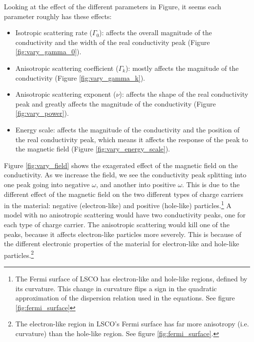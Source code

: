 Looking at the effect of the different parameters in Figure, it seems each parameter roughly has
these effects:
\begin{itemize}
    \item Isotropic scattering rate ($\Gamma_0$): affects the overall magnitude of the conductivity
        and the width of the real conductivity peak (Figure \ref{fig:vary_gamma_0}).
    \item Anisotropic scattering coefficient ($\Gamma_k$): mostly affects the magnitude of the
        conductivity (Figure \ref{fig:vary_gamma_k}).
    \item Anisotropic scattering exponent ($\nu$): affects the shape of the real conductivity peak
        and greatly affects the magnitude of the conductivity (Figure \ref{fig:vary_power}).
    \item Energy scale: affects the magnitude of the conductivity and the position of the real
        conductivity peak, which means it affects the response of the peak to the magnetic field
        (Figure \ref{fig:vary_energy_scale}).
\end{itemize}

Figure \ref{fig:vary_field} shows the exagerated effect of the magnetic field on the conductivity.
As we increase the field, we see the conductivity peak splitting into one peak going into negative
$\omega$, and another into positive $\omega$. This is due to the different effect of the magnetic
field on the two different types of charge carriers in the material: negative (electron-like)
and positive (hole-like) particles.\footnote{The Fermi surface of LSCO has electron-like
and hole-like regions, defined by its curvature. This change in curvature flips a sign in the quadratic approximation of the dispersion relation used in the equations. See figure \ref{fig:fermi_surface}} A model with no anisotropic scattering would have two conductivity peaks,
one for each type of charge carrier. The anisotropic scattering would kill one of the peaks,
because it affects electron-like particles more severely. This is because of the different
electronic properties of the material for electron-like and hole-like particles.\footnote{
The electron-like region in LSCO's Fermi surface has far more anisotropy (i.e. curvature)
than the hole-like region. See figure \ref{fig:fermi_surface}.}


